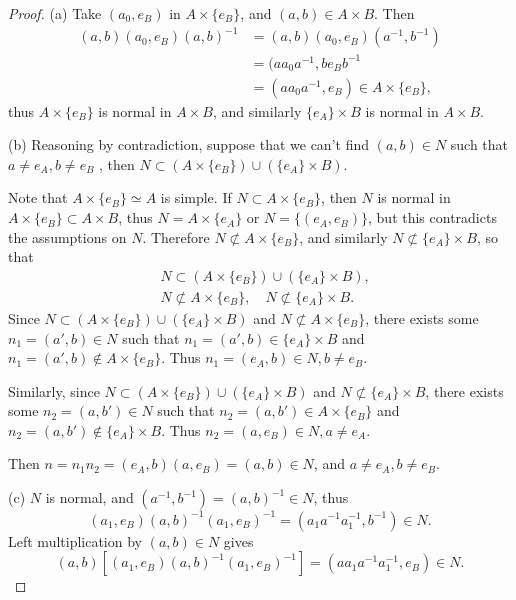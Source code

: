 \documentclass[11pt,a4paper]{article}
\begin{document}
\begin{proof}
\item[(a)] Take $(a_0,e_B)$ in $A\times\{e_B\}$, and $(a,b) \in A\times B$. Then
\begin{align*}
(a,b)(a_0,e_B)(a,b)^{-1} 
&=(a,b)(a_0,e_B)(a^{-1},b^{-1})\\
&=(aa_0a^{-1},be_Bb^{-1}\\
&=(aa_0a^{-1}, e_B) \in A \times\{e_B\},
\end{align*}
thus $A\times \{e_B\}$ is normal in $A \times B$, and similarly $\{e_A\} \times B$ is normal in $A \times B$.

\item[(b)] Reasoning by contradiction, suppose that we can't find $(a,b) \in N$ such that $a \ne e_A,b\ne e_B $ , then $N \subset (A \times \{e_B\}) \cup (\{e_A\} \times B)$. 

Note that $A\times \{e_B\} \simeq A$ is simple. If $N \subset A \times \{e_B\}$, then $N$ is normal in $A \times \{e_B\} \subset A \times B$, thus $N = A\times\{e_A\}$ or $N = \{(e_A,e_B)\}$, but this contradicts the assumptions on $N$. Therefore $N \not \subset A \times \{e_B\}$, and similarly $N \not \subset \{e_A\} \times B$, so that
\begin{align*}
&N \subset (A \times \{e_B\}) \cup (\{e_A\} \times B), \\
&N \not \subset A \times \{e_B\}, \quad N \not \subset \{e_A\} \times B.
\end{align*}
Since $N \subset (A \times \{e_B\}) \cup (\{e_A\} \times B)$ and $N \not \subset A \times \{e_B\}$, there exists some $n_1 = (a',b) \in N$ such that $n_1 = (a',b) \in \{e_A\} \times B$ and $n_1 = (a',b) \not \in A\times \{e_B\}$. Thus $n_1 = (e_A,b) \in N, b \ne e_B$.

Similarly, since  $N \subset (A \times \{e_B\}) \cup (\{e_A\} \times B)$ and $N \not \subset \{e_A\} \times B$, there exists some $n_2 = (a,b') \in N$ such that $n_2 = (a,b') \in A \times
 \{e_B\}$ and $n_2 = (a,b') \not \in \{e_A\} \times B$. Thus $n_2 = (a,e_B) \in N, a \ne e_A$.

Then $n = n_1n_2 =(e_A,b)(a,e_B) = (a,b) \in N$, and $a \ne e_A,b \ne e_B$.



\item[(c)] $N$ is normal, and  $(a^{-1},b^{-1}) = (a,b)^{-1} \in N$, thus
$$(a_1,e_B)(a,b)^{-1}(a_1,e_B)^{-1} = (a_1 a^{-1}a_1^{-1},b^{-1}) \in N.$$
Left multiplication by $(a,b) \in N$ gives
$$(a,b)[(a_1,e_B)(a,b)^{-1}(a_1,e_B)^{-1} ] = (aa_1a^{-1}a_1^{-1}, e_B) \in N.$$


\end{proof}
\end{document}
